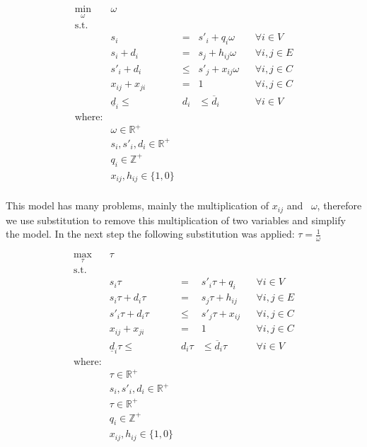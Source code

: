 \documentclass[11pt,twoside,a4paper]{book}
\begin{document}
\begin{equation}
\begin{matrix}
\displaystyle \min_\omega & \omega  \\
\textrm{s.t.} \\
& s_i & = & s'_i + q_i \omega & & \forall i \in V \\
& s_i + d_i & = & s_j + h_{ij} \omega & & \forall i, j \in E \\
& s'_i + d_i & \leq & s'_j + x_{ij} \omega & & \forall i, j \in C \\
& x_{ij} + x_{ji} & = & 1 & & \forall i, j \in C \\
& \underline{d}_i \leq &  d_i & \leq \overline{d}_i & & \forall i \in V \\

\textrm{where:} \\
& \omega \in \mathbb{R}^+\\
& s_i, s'_i, d_i \in \mathbb{R}^+\\
& q_i \in \mathbb{Z}^+\\
& x_{ij}, h_{ij} \in \{1, 0\} \\

\end{matrix}
\end{equation}

This model has many problems, mainly the multiplication of $x_{ij}$ and  $\omega$, therefore we use substitution to remove this multiplication of two variables and simplify the model. In the next step the following substitution was applied: $\tau = \frac{1}{\omega}$

\begin{equation}
\begin{matrix}
\displaystyle \max_\tau & \tau  \\
\textrm{s.t.} \\
& s_i \tau & = & s'_i \tau + q_i & & \forall i \in V \\
& s_i \tau + d_i \tau & = & s_j \tau + h_{ij} & & \forall i, j \in E \\
& s'_i \tau + d_i \tau & \leq & s'_j \tau + x_{ij} & & \forall i, j \in C \\
& x_{ij} + x_{ji} & = & 1 & & \forall i, j \in C \\
& \underline{d}_i \tau \leq &  d_i \tau & \leq \overline{d}_i \tau & & \forall i \in V \\

\textrm{where:} \\
& \tau \in \mathbb{R}^+\\
& s_i, s'_i, d_i \in \mathbb{R}^+\\
& \tau \in \mathbb{R}^+ \\
& q_i \in \mathbb{Z}^+\\
& x_{ij}, h_{ij} \in \{1, 0\} \\

\end{matrix}
\end{equation}
\end{document}
